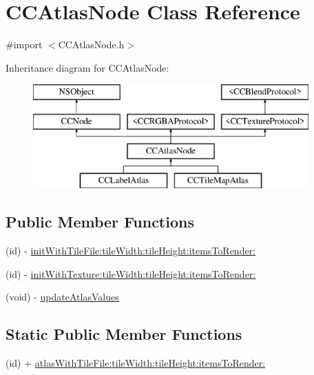 \hypertarget{interface_c_c_atlas_node}{\section{C\-C\-Atlas\-Node Class Reference}
\label{interface_c_c_atlas_node}
}


{\ttfamily \#import $<$C\-C\-Atlas\-Node.\-h$>$}

Inheritance diagram for C\-C\-Atlas\-Node\-:\begin{figure}[H]
\begin{center}
\leavevmode
\includegraphics[height=4.000000cm]{interface_c_c_atlas_node}
\end{center}
\end{figure}
\subsection*{Public Member Functions}
\begin{DoxyCompactItemize}
\item 
(id) -\/ \hyperlink{interface_c_c_atlas_node_adf18f68b5e35d7330f8bc60594c25663}{init\-With\-Tile\-File\-:tile\-Width\-:tile\-Height\-:items\-To\-Render\-:}
\item 
(id) -\/ \hyperlink{interface_c_c_atlas_node_a10aed9f8f2565d10520df2582af1baa2}{init\-With\-Texture\-:tile\-Width\-:tile\-Height\-:items\-To\-Render\-:}
\item 
(void) -\/ \hyperlink{interface_c_c_atlas_node_a044492e0d71cfae2f6e7c3070a4d45c9}{update\-Atlas\-Values}
\end{DoxyCompactItemize}
\subsection*{Static Public Member Functions}
\begin{DoxyCompactItemize}
\item 
(id) + \hyperlink{interface_c_c_atlas_node_a18b0064296f3321ac2fe8401ad81257d}{atlas\-With\-Tile\-File\-:tile\-Width\-:tile\-Height\-:items\-To\-Render\-:}
\end{DoxyCompactItemize}
